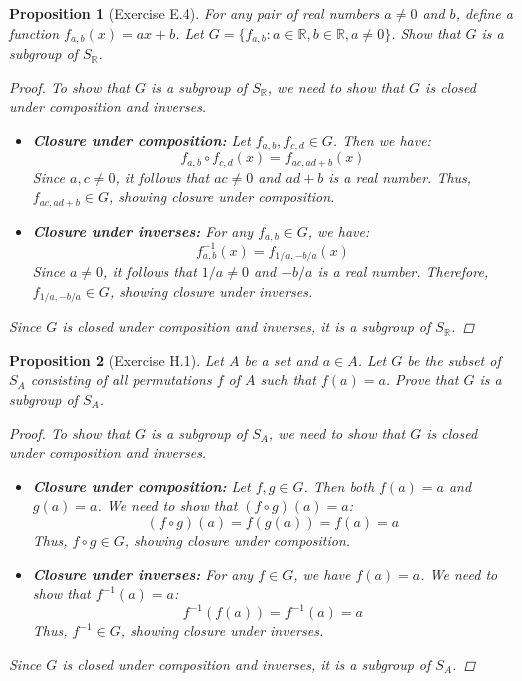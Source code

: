 \documentclass[12pt]{article}
\newcommand{\R}{\mathbb{R}} %
\newtheorem{proposition}{Proposition}
\begin{document}
\begin{proposition}[Exercise E.4]
  For any pair of real numbers $a \neq 0$ and $b$, define a function $f_{a,b}(x) = ax + b$.
  Let $G = \{f_{a,b} : a \in \R, b \in \R, a\neq 0\}$. Show that $G$ is a subgroup of $S_{\R}$.
  \begin{proof}
    To show that $G$ is a subgroup of $S_{\R}$, we need to show that $G$ is closed under composition and inverses.
    \begin{itemize}
      \item \textbf{Closure under composition:} Let $f_{a,b}, f_{c,d} \in G$.
            Then we have:
            \[
              f_{a,b} \circ f_{c,d}(x) = f_{ac, ad + b}(x)
            \]
            Since $a, c \neq 0$, it follows that $ac \neq 0$ and $ad + b$ is a real number.
            Thus, $f_{ac, ad + b} \in G$, showing closure under composition.

      \item \textbf{Closure under inverses:} For any $f_{a,b} \in G$, we have:
            \[
              f_{a,b}^{-1}(x) = f_{1/a, -b/a}(x)
            \]
            Since $a \neq 0$, it follows that $1/a \neq 0$ and $-b/a$ is a real number.
            Therefore, $f_{1/a, -b/a} \in G$, showing closure under inverses.
    \end{itemize}
    Since $G$ is closed under composition and inverses, it is a subgroup of $S_{\R}$.
  \end{proof}
\end{proposition}


\begin{proposition}[Exercise H.1]
  Let $A$ be a set and $a \in A$. Let $G$ be the subset of $S_A$ consisting of all permutations $f$ of $A$ such that $f(a) = a$.
  Prove that $G$ is a subgroup of $S_A$.
  \begin{proof}
    To show that $G$ is a subgroup of $S_A$, we need to show that $G$ is closed under composition and inverses.
    \begin{itemize}
      \item \textbf{Closure under composition:} Let $f, g \in G$.
            Then both $f(a) = a$ and $g(a) = a$.
            We need to show that $(f \circ g)(a) = a$:
            \[
              (f \circ g)(a) = f(g(a)) = f(a) = a
            \]
            Thus, $f \circ g \in G$, showing closure under composition.

      \item \textbf{Closure under inverses:} For any $f \in G$, we have $f(a) = a$.
            We need to show that $f^{-1}(a) = a$:
            \[
              f^{-1}(f(a)) = f^{-1}(a) = a
            \]
            Thus, $f^{-1} \in G$, showing closure under inverses.
    \end{itemize}
    Since $G$ is closed under composition and inverses, it is a subgroup of $S_A$.
  \end{proof}
\end{proposition}
\end{document}
